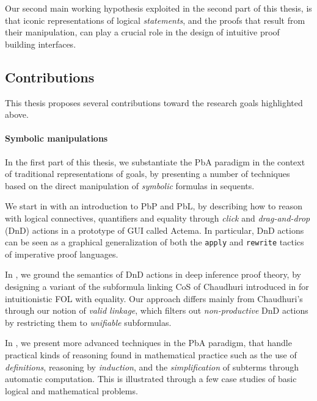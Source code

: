\begin{emphpar}
  Our second main working hypothesis exploited in the second part of this
  thesis, is that iconic representations of logical \emph{statements}, and the
  proofs that result from their manipulation, can play a crucial role in the
  design of intuitive proof building interfaces.
\end{emphpar}

\subsection{Contributions}

This thesis proposes several contributions toward the research goals highlighted
above.

\paragraph{Symbolic manipulations}
  
In the first part of this thesis, we substantiate the PbA paradigm in the
context of traditional representations of goals, by presenting a number of
techniques based on the direct manipulation of \emph{symbolic} formulas in
sequents.

We start in  with an introduction to PbP and PbL, by describing how
to reason with logical connectives, quantifiers and equality through
\emph{click} and \emph{drag-and-drop} (DnD) actions in a prototype of GUI called
Actema. In particular, DnD actions can be seen as a graphical generalization of
both the \texttt{apply} and \texttt{rewrite} tactics of imperative proof
languages.

In , we ground the semantics of DnD actions in deep inference proof
theory, by designing a variant of the subformula linking CoS of Chaudhuri
introduced in \cite{Chaudhuri2013} for intuitionistic FOL with equality. Our
approach differs mainly from Chaudhuri's through our notion of \emph{valid
linkage}, which filters out \emph{non-productive} DnD actions by restricting
them to \emph{unifiable} subformulas.

In , we present more advanced techniques in the PbA paradigm,
that handle practical kinds of reasoning found in mathematical practice such as
the use of \emph{definitions}, reasoning by \emph{induction}, and the
\emph{simplification} of subterms through automatic computation. This is
illustrated through a few case studies of basic logical and mathematical
problems.

